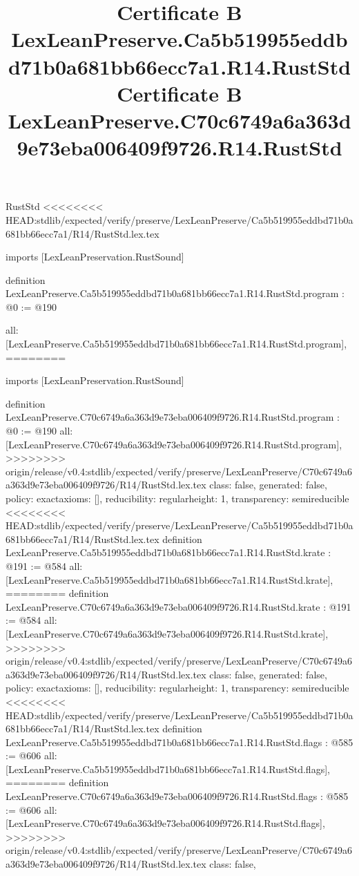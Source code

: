 \begin{lexlean}{RustStd}
<<<<<<<< HEAD:stdlib/expected/verify/preserve/LexLeanPreserve/Ca5b519955eddbd71b0a681bb66ecc7a1/R14/RustStd.lex.tex
\title{Certificate B LexLeanPreserve.Ca5b519955eddbd71b0a681bb66ecc7a1.R14.RustStd}
\begin{coremodule}
imports [LexLeanPreservation.RustSound]

definition LexLeanPreserve.Ca5b519955eddbd71b0a681bb66ecc7a1.R14.RustStd.program : @0 := @190 {
  all: [LexLeanPreserve.Ca5b519955eddbd71b0a681bb66ecc7a1.R14.RustStd.program],
========
\title{Certificate B LexLeanPreserve.C70c6749a6a363d9e73eba006409f9726.R14.RustStd}
\begin{coremodule}
imports [LexLeanPreservation.RustSound]

definition LexLeanPreserve.C70c6749a6a363d9e73eba006409f9726.R14.RustStd.program : @0 := @190 {
  all: [LexLeanPreserve.C70c6749a6a363d9e73eba006409f9726.R14.RustStd.program],
>>>>>>>> origin/release/v0.4:stdlib/expected/verify/preserve/LexLeanPreserve/C70c6749a6a363d9e73eba006409f9726/R14/RustStd.lex.tex
  class: false,
  generated: false,
  policy: exact{axioms: []},
  reducibility: regular{height: 1},
  transparency: semireducible
}
<<<<<<<< HEAD:stdlib/expected/verify/preserve/LexLeanPreserve/Ca5b519955eddbd71b0a681bb66ecc7a1/R14/RustStd.lex.tex
definition LexLeanPreserve.Ca5b519955eddbd71b0a681bb66ecc7a1.R14.RustStd.krate : @191 := @584 {
  all: [LexLeanPreserve.Ca5b519955eddbd71b0a681bb66ecc7a1.R14.RustStd.krate],
========
definition LexLeanPreserve.C70c6749a6a363d9e73eba006409f9726.R14.RustStd.krate : @191 := @584 {
  all: [LexLeanPreserve.C70c6749a6a363d9e73eba006409f9726.R14.RustStd.krate],
>>>>>>>> origin/release/v0.4:stdlib/expected/verify/preserve/LexLeanPreserve/C70c6749a6a363d9e73eba006409f9726/R14/RustStd.lex.tex
  class: false,
  generated: false,
  policy: exact{axioms: []},
  reducibility: regular{height: 1},
  transparency: semireducible
}
<<<<<<<< HEAD:stdlib/expected/verify/preserve/LexLeanPreserve/Ca5b519955eddbd71b0a681bb66ecc7a1/R14/RustStd.lex.tex
definition LexLeanPreserve.Ca5b519955eddbd71b0a681bb66ecc7a1.R14.RustStd.flags : @585 := @606 {
  all: [LexLeanPreserve.Ca5b519955eddbd71b0a681bb66ecc7a1.R14.RustStd.flags],
========
definition LexLeanPreserve.C70c6749a6a363d9e73eba006409f9726.R14.RustStd.flags : @585 := @606 {
  all: [LexLeanPreserve.C70c6749a6a363d9e73eba006409f9726.R14.RustStd.flags],
>>>>>>>> origin/release/v0.4:stdlib/expected/verify/preserve/LexLeanPreserve/C70c6749a6a363d9e73eba006409f9726/R14/RustStd.lex.tex
  class: false,
}}}
\end{coremodule}}
\end{coremodule}
\end{lexlean}

